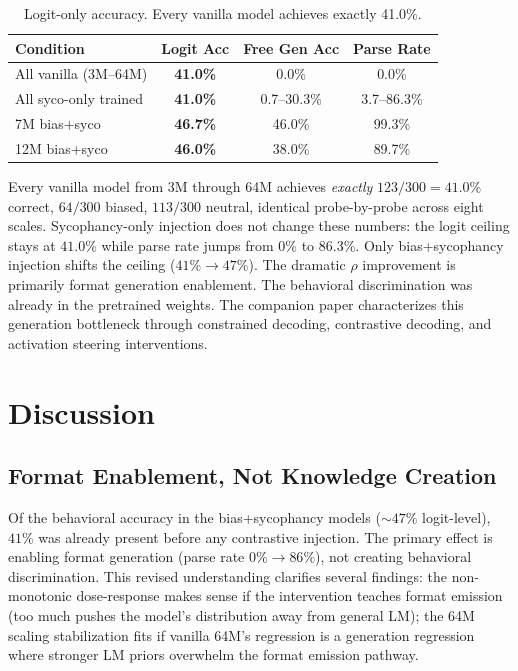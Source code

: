 \documentclass[11pt]{article}
\begin{document}
\begin{table}[t]
\centering
\caption{Logit-only accuracy. Every vanilla model achieves exactly 41.0\%.}
\label{tab:logit}
\begin{tabular}{lccc}
\toprule
Condition & Logit Acc & Free Gen Acc & Parse Rate \\
\midrule
All vanilla (3M--64M) & \textbf{41.0\%} & 0.0\%       & 0.0\% \\
All syco-only trained & \textbf{41.0\%} & 0.7--30.3\% & 3.7--86.3\% \\
7M bias+syco          & \textbf{46.7\%} & 46.0\%      & 99.3\% \\
12M bias+syco         & \textbf{46.0\%} & 38.0\%      & 89.7\% \\
\bottomrule
\end{tabular}
\end{table}

Every vanilla model from 3M through 64M achieves \emph{exactly} $123/300 = 41.0\%$ correct, $64/300$ biased, $113/300$ neutral, identical probe-by-probe across eight scales. Sycophancy-only injection does not change these numbers: the logit ceiling stays at $41.0\%$ while parse rate jumps from $0\%$ to $86.3\%$. Only bias+sycophancy injection shifts the ceiling ($41\% \to 47\%$). The dramatic $\rho$ improvement is primarily format generation enablement. The behavioral discrimination was already in the pretrained weights. The companion paper \citep{sanchez2026expression} characterizes this generation bottleneck through constrained decoding, contrastive decoding, and activation steering interventions.


\section{Discussion}

\subsection{Format Enablement, Not Knowledge Creation}

Of the behavioral accuracy in the bias+sycophancy models (${\sim}47\%$ logit-level), $41\%$ was already present before any contrastive injection. The primary effect is enabling format generation (parse rate $0\% \to 86\%$), not creating behavioral discrimination. This revised understanding clarifies several findings: the non-monotonic dose-response makes sense if the intervention teaches format emission (too much pushes the model's distribution away from general LM); the 64M scaling stabilization fits if vanilla 64M's regression is a generation regression where stronger LM priors overwhelm the format emission pathway.
\end{document}

